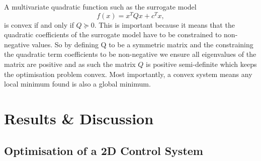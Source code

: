 \documentclass[conference]{IEEEtran}
\theoremstyle{definition}
\begin{document}
A multivariate quadratic function such as the surrogate model
\begin{equation}
    f(x) = x^TQx + c^Tx,
\end{equation}
is convex if and only if $Q \succcurlyeq 0$. This is important because it means that the quadratic coefficients of the surrogate model have to be constrained to non-negative values. So by defining Q to be a symmetric matrix and the constraining the quadratic term coefficients to be non-negative we ensure all eigenvalues of the matrix are positive and as such the matrix $Q$ is positive semi-definite which keeps the optimisation problem convex. Most importantly, a convex system means any local minimum found is also a global minimum. 


\section{Results \& Discussion}
\subsection{Optimisation of a 2D Control System}
\end{document}
